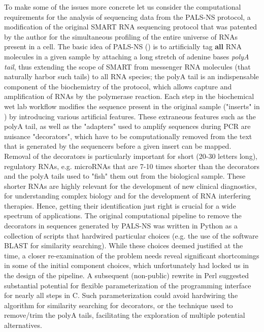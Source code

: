 \documentclass[10pt]{article}
\begin{document}
To make some of the issues more concrete let us consider the computational requirements for the analysis of sequencing data from the PALS-NS protocol\cite{mackenzie_make_2022}, a  modification of the original SMART RNA sequencing protocol\cite{zhu_reverse_2001} that was patented by the author for the simultaneous profiling of the entire universe of RNAs present in a cell. The basic idea of PALS-NS () is to artificially tag \textbf{all} RNA molecules in a given sample by attaching a long stretch of adenine bases \textit{polyA tail}, thus extending the scope of SMART from messenger RNA molecules (that naturally harbor such tails) to all RNA species; the polyA tail is an indispensable component of the biochemistry of the protocol, which allows capture and amplification of RNAs by the polymerase reaction. Each step in the biochemical wet lab workflow modifies the sequence present in the original sample ("inserts" in ) by introducing various artificial features. These extraneous features such as the polyA tail, as well as the "adapters" used to amplify sequences during PCR are nuisance "decorators", which have to be computationally removed from the text that is generated by the sequencers before a given insert can be mapped. Removal of the decorators is particularly important for short (20-30 letters long), regulatory RNAs, e.g. microRNAs that are 7-10 times shorter than the decorators and the polyA tails used to "fish" them out from the biological sample. These shorter RNAs are highly relevant for the development of new clinical diagnostics, for understanding complex biology and for the development of RNA interfering therapies. Hence, getting their identification just right is crucial for a wide spectrum of applications. 
\linebreak The original computational pipeline to remove the decorators in sequences generated by PALS-NS was written in Python as a collection of scripts that hardwired particular choices (e.g. the use of the software BLAST\cite{camacho_blast_2009} for similarity searching). While these choices deemed justified at the time, a closer re-examination of the problem needs reveal significant shortcomings in some of the initial component choices, which unfortunately had locked us in the design of the pipeline.  A subsequent (non-public) rewrite in Perl suggested substantial potential for flexible parameterization of the programming interface for nearly all steps in C. Such parameterization could avoid hardwiring the algorithm for similarity searching for decorators, or the technique used to remove/trim the polyA tails, facilitating the exploration of multiple potential alternatives. 
\end{document}
